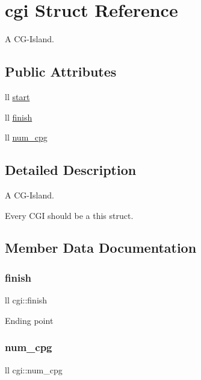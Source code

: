 \hypertarget{structcgi}{}\section{cgi Struct Reference}
\label{structcgi}


A C\+G-\/\+Island.  


\subsection*{Public Attributes}
\begin{DoxyCompactItemize}
\item 
ll \hyperlink{structcgi_ab5f8ab596a841ac196d8b653ff67ab03}{start}
\item 
ll \hyperlink{structcgi_ae57be54a02c1a9d8368c5631278396ce}{finish}
\item 
ll \hyperlink{structcgi_ac5c3fceff055e5e56bc8252f71cb23e0}{num\+\_\+cpg}
\end{DoxyCompactItemize}


\subsection{Detailed Description}
A C\+G-\/\+Island. 

Every C\+GI should be a this struct. 

\subsection{Member Data Documentation}
\mbox{\label{structcgi_ae57be54a02c1a9d8368c5631278396ce}} 
\subsubsection{\texorpdfstring{finish}{finish}}
{\footnotesize\ttfamily ll cgi\+::finish}

Ending point \mbox{\label{structcgi_ac5c3fceff055e5e56bc8252f71cb23e0}} 
\subsubsection{\texorpdfstring{num\+\_\+cpg}{num\_cpg}}
{\footnotesize\ttfamily ll cgi\+::num\+\_\+cpg}

